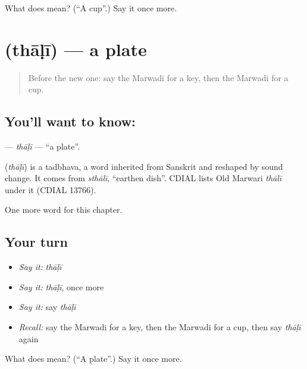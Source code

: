 \begin{tcolorbox}[breakable,colback=teal!4,colframe=teal!35!black,title={Before you move on}]
What does  mean? (\textquotedblleft{}A cup\textquotedblright{}.) Say it once more.
\end{tcolorbox}
\section[\texorpdfstring{\mw{थाळी} (thāḷī)}{थाळी (thāḷī)}]{ (thāḷī) — a plate}

\label{lesson:MW-C64-thali}



\begin{quote}
Before the new one: say the Marwadi for a key, then the Marwadi for a cup.
\end{quote}

\subsection*{You'll want to know: }
\textbf{} — \emph{thāḷī} — \textquotedblleft{}a plate\textquotedblright{}.

\begin{cousinweb}
\textbf{} (\emph{thāḷī}) is a tadbhava, a word inherited from Sanskrit and reshaped by sound change. It comes from \emph{sthālī}, \textquotedblleft{}earthen dish\textquotedblright{}. CDIAL lists Old Marwari \emph{thālī} under it (CDIAL 13766).
\end{cousinweb}

\begin{grammarlens}[title={What you've built}]
One more word for this chapter.
\end{grammarlens}

\subsection*{Your turn}
\begin{itemize}
\raggedright
  \item \emph{Say it:} \emph{thāḷī}
  \item \emph{Say it:} \emph{thāḷī}, once more
  \item \emph{Say it:} say \emph{thāḷī}
  \item \emph{Recall:} say the Marwadi for a key, then the Marwadi for a cup, then say \emph{thāḷī} again
\end{itemize}

\begin{tcolorbox}[breakable,colback=teal!4,colframe=teal!35!black,title={Before you move on}]
What does  mean? (\textquotedblleft{}A plate\textquotedblright{}.) Say it once more.
\end{tcolorbox}
